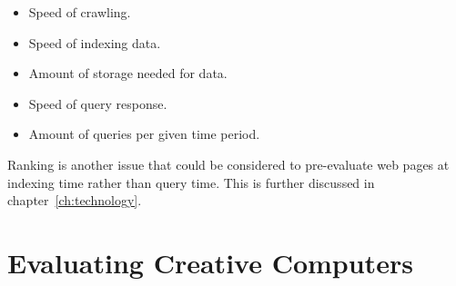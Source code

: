 \begin{itemize}
  \item Speed of crawling.
  \item Speed of indexing data.
  \item Amount of storage needed for data.
  \item Speed of query response.
  \item Amount of queries per given time period.
\end{itemize}

Ranking is another issue that could be considered to pre-evaluate web pages at indexing time rather than query time. This is further discussed in chapter~\ref{ch:technology}.






\section{Evaluating Creative Computers}
\label{s:creattributes}


